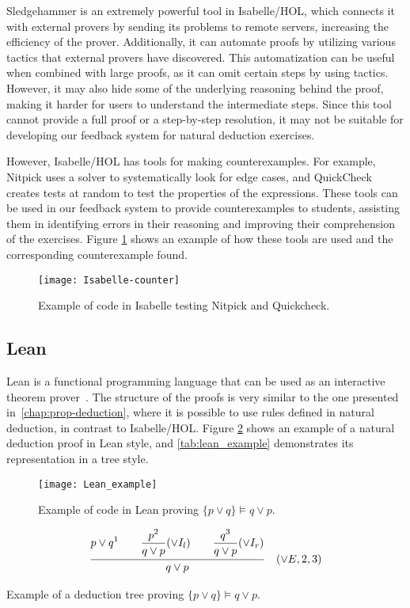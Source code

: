 Sledgehammer is an extremely powerful tool in Isabelle/HOL, which connects it with external provers by sending its problems to remote servers, increasing the efficiency of the prover. Additionally, it can automate proofs by utilizing various tactics that external provers have discovered. This automatization can be useful when combined with large proofs, as it can omit certain steps by using tactics. However, it may also hide some of the underlying reasoning behind the proof, making it harder for users to understand the intermediate steps. Since this tool cannot provide a full proof or a step-by-step resolution, it may not be suitable for developing our feedback system for natural deduction exercises.

However, Isabelle/HOL has tools for making counterexamples. For example, Nitpick uses a solver to systematically look for edge cases, and QuickCheck creates tests at random to test the properties of the expressions. These tools can be used in our feedback system to provide counterexamples to students, assisting them in identifying errors in their reasoning and improving their comprehension of the exercises. Figure \ref{img:isabelle-counter} shows an example of how these tools are used and the corresponding counterexample found.
\begin{figure}[htbp]
    \centering
    \texttt{[image: Isabelle-counter]}
    \caption{Example of code in Isabelle testing Nitpick and Quickcheck.}
    \label{img:isabelle-counter}
\end{figure}


    
\subsection{Lean}
Lean is a functional programming language that can be used as an interactive theorem prover~\cite{programming}. The structure of the proofs is very similar to the one presented in~\ref{chap:prop-deduction}, where it is possible to use rules defined in natural deduction, in contrast to Isabelle/HOL. Figure \ref{img:lean_example} shows an example of a natural deduction proof in Lean style, and \ref{tab:lean_example} demonstrates its representation in a tree style.

\begin{figure}[htbp]
    \centering
    \texttt{[image: Lean\_example]}
    \caption{Example of code in Lean proving \(\{p \lor q\} \models q \lor p \).}
    \label{img:lean_example}
\end{figure}
\begin{table}[h!]
    \centering
        \[
            \frac{ {\displaystyle {p \lor q}^1 
            \quad \quad \displaystyle \frac{\displaystyle p^2}{q \lor p \strut} (\lor I_l) \strut}
            \quad \quad \displaystyle \frac{\displaystyle q^3}{q \lor p \strut} (\lor I_r) \strut}
            {\displaystyle q \lor p \strut} \quad (\vee E, 2, 3)
          \]
          \caption{Example of a deduction tree proving \(\{p \lor q\} \models q \lor p \).}
          \label{tab:lean_example}
      \end{table}

